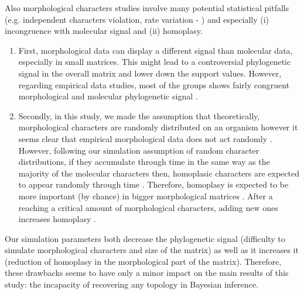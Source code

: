 \documentclass[12pt,letterpaper]{article}
\begin{document}
Also morphological characters studies involve many potential statistical pitfalls (e.g. independent characters violation, rate variation - \citet{davalosintegrating2014}) and especially (i) incongruence with molecular signal and (ii) homoplasy. %
\begin{enumerate}
\item{First, morphological data can display a different signal than molecular data, especially in small matrices. %
This might lead to a controversial phylogenetic signal in the overall matrix and lower down the support values.
However, regarding empirical data studies, most of the groups shows fairly congruent morphological and molecular phylogenetic signal \citep[e.g.][]{leerates2013}.}
\item{Secondly, in this study, we made the assumption that theoretically, morphological characters are randomly distributed on an organism however it seems clear that empirical morphological data does not act randomly \citep{sansomfossilization2013}.
However, following our simulation assumption of random character distributions, if they accumulate through time in the same way as the majority of the molecular characters then, homoplasic characters are expected to appear randomly through time \citep{davalosintegrating2014}.
Therefore, homoplasy is expected to be more important (by chance) in bigger morphological matrices \citep{davalosintegrating2014}.
After a reaching a critical amount of morphological characters, adding new ones increases homoplasy \citep{wagner2000}.}
\end{enumerate}
Our simulation parameters both decrease the phylogenetic signal (difficulty to simulate morphological characters and size of the matrix) as well as it increases it (reduction of homoplasy in the morphological part of the matrix).
Therefore, these drawbacks seems to have only a minor impact on the main results of this study: the incapacity of recovering any topology in Bayesian inference.
\end{document}
